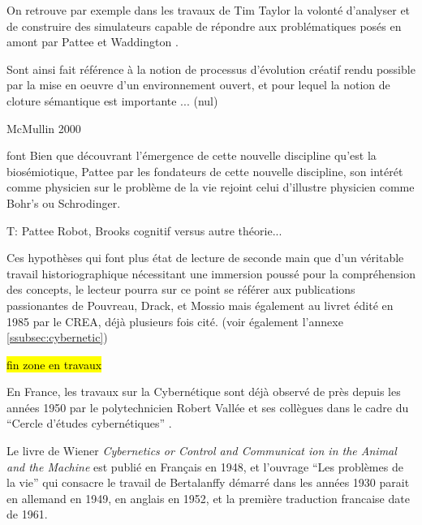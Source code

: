 On retrouve par exemple dans les travaux de Tim Taylor la volonté d'analyser et de construire des simulateurs capable de répondre aux  problématiques posés en amont par Pattee et Waddington \autocite{Taylor1999}. 

Sont ainsi fait référence à la notion de processus d'évolution créatif rendu possible par la mise en oeuvre d'un environnement ouvert, et pour lequel la notion de cloture sémantique est importante ... (nul)

McMullin 2000

 font Bien que découvrant l'émergence de cette nouvelle discipline qu'est la biosémiotique, Pattee par les fondateurs de cette nouvelle discipline, son intérét comme physicien sur le problème de la vie rejoint celui d'illustre physicien comme Bohr's ou Schrodinger. 

T: Pattee Robot, Brooks cognitif versus autre théorie...




Ces hypothèses qui font plus état de lecture de seconde main que d'un véritable travail historiographique nécessitant une immersion poussé pour la compréhension des concepts, le lecteur pourra sur ce point se référer aux publications passionantes de Pouvreau, Drack, et Mossio \autocites{Pouvreau2006, Pouvreau2013, Drack2015} mais également au livret édité en 1985 par le CREA, déjà plusieurs fois cité. (voir également l'annexe \ref{ssubsec:cybernetic})


\hl{fin zone en travaux}

En France, les travaux sur la Cybernétique sont déjà observé de près depuis les années 1950 par le polytechnicien Robert Vallée et ses collègues dans le cadre du \enquote{Cercle d’études cybernétiques} \autocite{Bricage1990}. 

Le livre de Wiener \textit{Cybernetics or Control and Communicat
ion in the Animal and the Machine} est publié en Français en 1948, et l'ouvrage \enquote{Les problèmes de la vie}  qui consacre le travail de Bertalanffy démarré dans les années 1930 parait en allemand en 1949, en anglais en 1952, et la première traduction francaise date de 1961. \autocite{Vallee2005}

